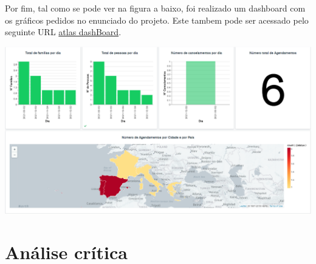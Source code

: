 \documentclass{article}
\begin{document}
Por fim, tal como se pode ver na figura a baixo, foi realizado um dashboard com os gráficos pedidos no enunciado do projeto. Este tambem pode ser acessado pelo seguinte URL \href{https://charts.mongodb.com/charts-pei-rpoxp/public/dashboards/f146621d-6895-4e8d-899d-b7a0a87c402c}{atlas dashBoard}. \par

\begin{center}
    \includegraphics[scale=0.52]{Images/Dashboard.PNG}
\end{center}


\newpage
\section{Análise crítica}
\end{document}
